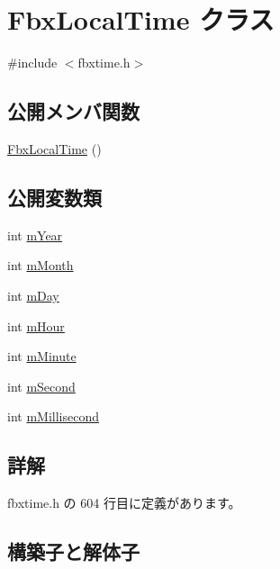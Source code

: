 \hypertarget{class_fbx_local_time}{}\section{Fbx\+Local\+Time クラス}
\label{class_fbx_local_time}


{\ttfamily \#include $<$fbxtime.\+h$>$}

\subsection*{公開メンバ関数}
\begin{DoxyCompactItemize}
\item 
\hyperlink{class_fbx_local_time_a2e58f18360c183ab9f844ab79a8fa026}{Fbx\+Local\+Time} ()
\end{DoxyCompactItemize}
\subsection*{公開変数類}
\begin{DoxyCompactItemize}
\item 
int \hyperlink{class_fbx_local_time_a824c8b3c8dcab952b4e75436e696c519}{m\+Year}
\item 
int \hyperlink{class_fbx_local_time_ab952f33eb09aaace10187d943f16331e}{m\+Month}
\item 
int \hyperlink{class_fbx_local_time_a1ce97711f03bbf4af9cb03616468bf2b}{m\+Day}
\item 
int \hyperlink{class_fbx_local_time_addcd36b883d1d12ae3ac4a1970b2b03d}{m\+Hour}
\item 
int \hyperlink{class_fbx_local_time_afe3483e57271409b93ab1523a4b02c53}{m\+Minute}
\item 
int \hyperlink{class_fbx_local_time_a5ebbe9a0fb42e63790c1bb2d4844b86c}{m\+Second}
\item 
int \hyperlink{class_fbx_local_time_a06cda6f73301118df828834a97e870a2}{m\+Millisecond}
\end{DoxyCompactItemize}


\subsection{詳解}


 fbxtime.\+h の 604 行目に定義があります。



\subsection{構築子と解体子}
\mbox{\label{class_fbx_local_time_a2e58f18360c183ab9f844ab79a8fa026}} 
